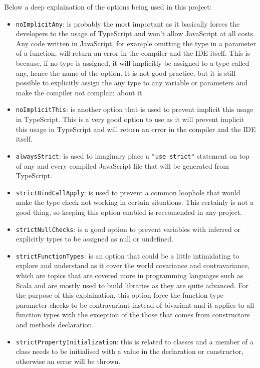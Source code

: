 \newpage
Below a deep explaination of the options being used in this project:
\begin{itemize}
  \item \texttt{noImplicitAny}: is probably the most important as it basically
  forces the developers to the usage of TypeScript and won't allow JavaScript at
  all costs. Any code written in JavaScript, for example omitting the type in a
  parameter of a function, will return an error in the compiler and the IDE
  itself. This is because, if no type is assigned, it will implicitly be
  assigned to a type called any, hence the name of the option. It is not good
  practice, but it is still possible to explicitly assign the any type to any
  variable or parameters and make the compiler not complain about it.
  \item \texttt{noImplicitThis}: is another option that is used to prevent
  implicit this usage in TypeScript. This is a very good option to use as it
  will prevent implicit this usage in TypeScript and will return an error in the
  compiler and the IDE itself.
  \item \texttt{alwaysStrict}: is used to imaginary place a \texttt{"use
  strict"} statement on top of any and every compiled JavaScript file that will
  be generated from TypeScript.
  \item \texttt{strictBindCallApply}: is used to prevent a common loophole
  that would make the type check not working in certain situations. This
  certainly is not a good thing, so keeping this option enabled is reccomended
  in any project.
  \item \texttt{strictNullChecks}: is a good option to prevent variables
  with inferred or explicitly types to be assigned as null or undefined.
  \item \texttt{strictFunctionTypes}: is an option that could be a little
  intimidating to explore and understand as it cover the world covariance and
  contravariance, which are topics that are covered more in programming
  languages such as Scala and are mostly used to build libraries as they are
  quite advanced. For the purpose of this explaination, this option force the
  function type parameter checks to be contravariant instead of bivariant and it
  applies to all function types with the exception of the those that comes from
  constructors and methods declaration.
  \item \texttt{strictPropertyInitialization}: this is related to classes and
  a member of a class needs to be initialised with a value in the declaration or
  constructor, otherwise an error will be thrown.
\end{itemize}

